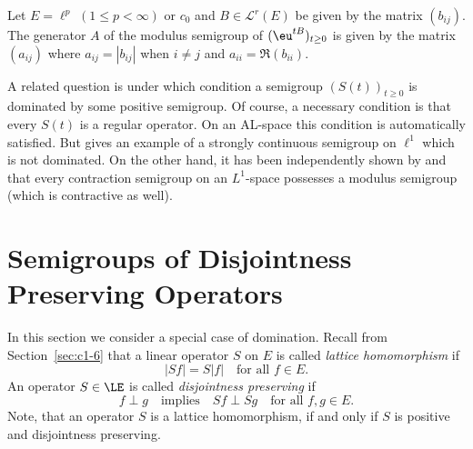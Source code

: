 \begin{example}\label{ex:c2-4.19}
Let $E = \ell^{p}$ $(1 \leq p < \infty)$ or $c_{0}$ and $B \in \mathcal{L}^{r}(E)$ be
given by the matrix $(b_{ij})$.
The generator $A$ of the modulus semigroup of\/ $(\eu^{tB})_{t \geq 0}$ is given by the matrix $(a_{ij})$ where $a_{ij} = |b_{ij}|$ when $i \neq j$ and $a_{ii} = \Re(b_{ii})$.
\end{example}
A related question is under which condition a semigroup $(S(t))_{t \geq 0}$ is
dominated by some positive semigroup.
Of course, a necessary condition is that every $S(t)$ is a regular operator.
On an AL-space this condition is automatically satisfied.
But \textcite{kipnis:1974} gives an example of a strongly continuous semigroup on $\ell^{1}$ which is not dominated.
On the other hand, it has been independently shown by \textcite{kipnis:1974} and
\textcite{kubokawa:1975} that every contraction semigroup on an $L^{1}$-space
possesses a modulus semigroup (which is contractive as well).
\section{Semigroups of Disjointness Preserving Operators} \label{sec:c2-5}%
In this section we consider a special case of domination. 
Recall from Section~\ref{sec:c1-6} 
that a linear operator $S$ on $E$ is called \emph{lattice homomorphism} if
\begin{equation}\label{eq:c2-5.1}
|Sf| = S|f| \quad \text{for all } f \in E.
\end{equation}
An operator $S \in \LE$ is called \emph{disjointness preserving} if
\begin{equation}\label{eq:c2-5.2}
f \perp g \quad \text{implies} \quad Sf \perp Sg \quad \text{for all } f,g \in E.
\end{equation}
Note, that an operator $S$ is a lattice homomorphism, if and only if\/ $S$
is positive and disjointness preserving.

